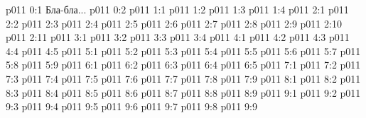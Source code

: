 \author{Совершенствователь Мудрости}
\vs p011 0:1  Бла-бла...
\vs p011 0:2 
\vs p011 1:1 
\vs p011 1:2 
\vs p011 1:3 \pc 
\vs p011 1:4 
\vs p011 2:1 
\vs p011 2:2 \pc 
\vs p011 2:3 
\vs p011 2:4 \pc 
\vs p011 2:5 
\vs p011 2:6 
\vs p011 2:7 
\vs p011 2:8 \pc 
\vs p011 2:9 \pc 
\vs p011 2:10 
\vs p011 2:11 
\vs p011 3:1 
\vs p011 3:2 
\vs p011 3:3 
\vs p011 3:4 
\vs p011 4:1 
\vs p011 4:2 
\vs p011 4:3 
\vs p011 4:4 
\vs p011 4:5 
\vs p011 5:1 
\vs p011 5:2 
\vs p011 5:3 
\vs p011 5:4 
\vs p011 5:5 \pc 
\vs p011 5:6 \pc 
\vs p011 5:7 \pc 
\vs p011 5:8 
\vs p011 5:9 \pc 
{}
\vs p011 6:1 
\vs p011 6:2 
\vs p011 6:3 \pc 
\vs p011 6:4 \pc 
\vs p011 6:5 
\vs p011 7:1 
\vs p011 7:2 
\vs p011 7:3 
\vs p011 7:4 \pc 
\vs p011 7:5 
\vs p011 7:6 
\vs p011 7:7 \pc 
\vs p011 7:8 
\vs p011 7:9 
\vs p011 8:1 
\vs p011 8:2 
\vs p011 8:3 
\vs p011 8:4 \pc 
\vs p011 8:5 
\vs p011 8:6 
\vs p011 8:7 
\vs p011 8:8 \pc 
\vs p011 8:9 
\vs p011 9:1 
\vs p011 9:2 \pc 
\vs p011 9:3 \pc 
\vs p011 9:4 
\vs p011 9:5 \pc 
\vs p011 9:6 \pc 
\vs p011 9:7 
\vs p011 9:8 \pc 
\vsetoff
\vs p011 9:9 
\quizlink
